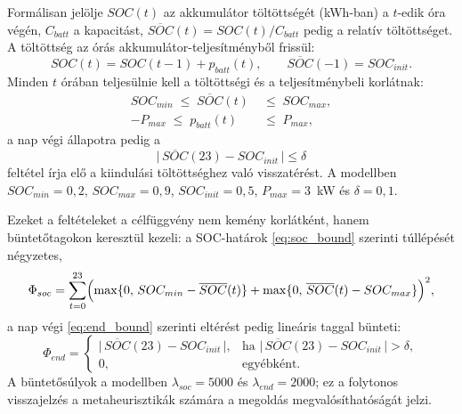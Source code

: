 Formálisan jelölje $SOC(t)$ az akkumulátor töltöttségét (kWh-ban) a $t$-edik óra végén, $C_{batt}$ a kapacitást, $\overline{SOC}(t)=SOC(t)/C_{batt}$ pedig a relatív töltöttséget. A töltöttség az órás akkumulátor-teljesítményből frissül:
\begin{equation}
SOC(t) = SOC(t-1) + p_{batt}(t), \qquad \overline{SOC}(-1) = SOC_{init}.
\end{equation}
Minden $t$ órában teljesülnie kell a töltöttségi és a teljesítménybeli korlátnak:
\begin{align}
SOC_{min} \;\le\; \overline{SOC}(t) \;&\le\; SOC_{max}, \label{eq:soc_bound}\\
-P_{max} \;\le\; p_{batt}(t) \;&\le\; P_{max}, \label{eq:rate_bound}
\end{align}
a nap végi állapotra pedig a
\begin{equation}
\bigl|\,\overline{SOC}(23) - SOC_{init}\,\bigr| \le \delta \label{eq:end_bound}
\end{equation}
feltétel írja elő a kiindulási töltöttséghez való visszatérést. A modellben $SOC_{min}=0{,}2$, $SOC_{max}=0{,}9$, $SOC_{init}=0{,}5$, $P_{max}=3$~kW és $\delta=0{,}1$.

Ezeket a feltételeket a célfüggvény nem kemény korlátként, hanem büntetőtagokon keresztül kezeli: a SOC-határok \eqref{eq:soc_bound} szerinti túllépését négyzetes,
\begin{equation}
\Phi_{soc} = \sum_{t=0}^{23} \Bigl( \max\{0,\, SOC_{min}-\overline{SOC}(t)\} + \max\{0,\, \overline{SOC}(t)-SOC_{max}\} \Bigr)^2,
\end{equation}
a nap végi \eqref{eq:end_bound} szerinti eltérést pedig lineáris taggal bünteti:
\begin{equation}
\Phi_{end} =
\begin{cases}
\bigl|\,\overline{SOC}(23) - SOC_{init}\,\bigr|, & \text{ha } \bigl|\,\overline{SOC}(23) - SOC_{init}\,\bigr| > \delta,\\[2pt]
0, & \text{egyébként.}
\end{cases}
\end{equation}
A büntetősúlyok a modellben $\lambda_{soc}=5000$ és $\lambda_{end}=2000$; ez a folytonos visszajelzés a metaheurisztikák számára a megoldás megvalósíthatóságát jelzi.

